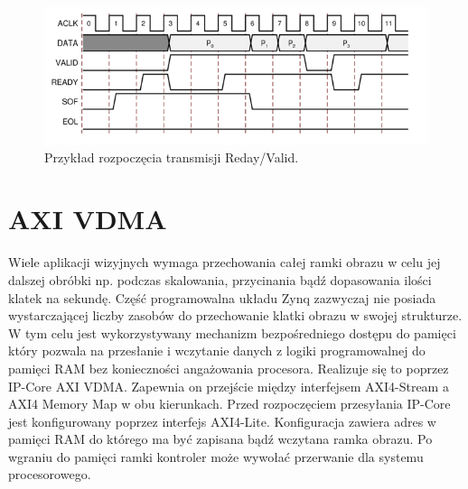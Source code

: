 \begin{figure}[h]
    \centering
    \includegraphics[width=1\textwidth]{images/axi-stream_hendshake}
    \caption{Przykład rozpoczęcia transmisji Reday/Valid.}
    \label{fig:handshake}
\end{figure}

\section{AXI VDMA}
Wiele aplikacji wizyjnych wymaga przechowania całej ramki obrazu w celu jej dalszej obróbki np. podczas skalowania, przycinania bądź dopasowania ilości klatek na sekundę. Część programowalna układu Zynq zazwyczaj nie posiada wystarczającej liczby zasobów do przechowanie klatki obrazu w swojej strukturze. W tym celu jest wykorzystywany mechanizm bezpośredniego dostępu do pamięci który pozwala na przesłanie i wczytanie danych z logiki programowalnej do pamięci RAM bez konieczności angażowania procesora. Realizuje się to poprzez IP-Core AXI VDMA. Zapewnia on przejście między interfejsem AXI4-Stream a AXI4 Memory Map w obu kierunkach. Przed rozpoczęciem przesyłania IP-Core jest konfigurowany poprzez interfejs AXI4-Lite. Konfiguracja zawiera adres w pamięci RAM do którego ma być zapisana bądź wczytana ramka obrazu. Po wgraniu do pamięci ramki kontroler może wywołać przerwanie dla systemu procesorowego.